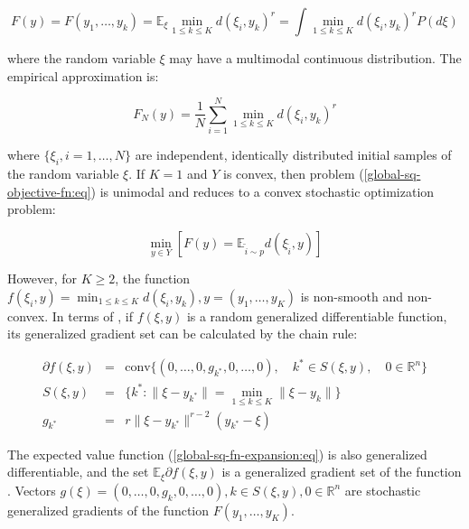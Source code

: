 \begin{equation}
    \label{smooth-stoch-fn-expansion:eq}
        F(y) = F(y_1, \ldots, y_k) = \mathbb{E}_{\xi} \min_{1 \leq k \leq K} d(\xi_i, y_k)^r = \int \min_{1 \leq k \leq K} d(\xi_i, y_k)^r P(d \xi)
\end{equation}

\noindent where the random variable $\xi$ may have a multimodal continuous distribution. The empirical approximation is:

\begin{equation}
    \label{empirical-stoch-fn-expansion:eq}
        F_N(y) = \frac{1}{N} \sum_{i=1}^N \min_{1 \leq k \leq K} d(\xi_i, y_k)^r
\end{equation}

\noindent where $\{\xi_i, i = 1, \ldots, N\}$ are independent, identically distributed initial samples of the random variable $\xi$. If $K = 1$ and $Y$ is convex, then problem (\ref{global-sq-objective-fn:eq}) is unimodal and reduces to a convex stochastic optimization problem:

\begin{equation}
    \label{convex-stoch-opt-problem:eq}
        \min_{y \in Y} [ F(y) =  \mathbb{E}_{\tilde{i} \sim p} d(\xi_{\tilde{i}}, y) ]
\end{equation}

However, for $K \geq 2$, the function $f(\xi_i, y) = \min_{1 \leq k \leq K} d(\xi_i, y_k), y = (y_1, \ldots, y_K)$ is non-smooth and non-convex. In terms of \cite{mikhalevich2024,Norkin_1986}, if $f(\xi, y)$ is a random generalized differentiable function, its generalized gradient set can be calculated by the chain rule:

\begin{eqnarray}
    \label{sq-objective-fn-gradient:eq}
        \partial f(\xi, y) &=& \text{conv} \{ (0, \ldots, 0, g_{k^*}, 0, \ldots, 0), \quad k^* \in S(\xi, y), \quad 0 \in \mathbb{R}^n \} \nonumber \\
        S(\xi, y) &=& \{ k^*: \| \xi - y_{k^*} \| = \min_{1 \leq k \leq K} \| \xi - y_k \| \} \nonumber \\
        g_{k^*} &=& r \| \xi - y_{k^*} \|^{r - 2} (y_{k^*} - \xi)
\end{eqnarray}

The expected value function (\ref{global-sq-fn-expansion:eq}) is also generalized differentiable, and the set $\mathbb{E}_{\xi} \partial f(\xi, y)$ is a generalized gradient set of the function \cite{mikhalevich2024,Norkin_1986}. Vectors $g(\xi) = (0, \ldots, 0, g_k, 0, \ldots, 0), k \in S(\xi, y), 0 \in \mathbb{R}^n$ are stochastic generalized gradients of the function $F(y_1, \ldots, y_K)$.

